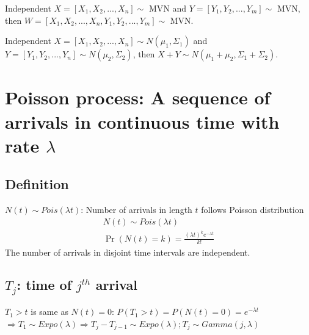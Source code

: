 \documentclass[11pt]{elegantbook}
\begin{document}
\begin{theorem}
    Independent $X=[X_1,X_2,...,X_n]\sim$ MVN and $Y=[Y_1,Y_2,...,Y_m]\sim$ MVN, then $W=[X_1,X_2,...,X_n,Y_1,Y_2,...,Y_m]\sim$ MVN.
\end{theorem}

\begin{theorem}
    Independent $X=[X_1,X_2,...,X_n]\sim N(\mu_1,\Sigma_1)$ and $Y=[Y_1,Y_2,...,Y_n]\sim N(\mu_2,\Sigma_2)$, then $X+Y\sim N(\mu_1+\mu_2,\Sigma_1+\Sigma_2)$.
\end{theorem}














\section{Poisson process: A sequence of arrivals in continuous time with rate $\lambda$}
\subsection{Definition}
$N(t)\sim Pois(\lambda t)$: Number of arrivals in length $t$ follows Poisson distribution
\begin{equation}
    \begin{aligned}
        N(t)\sim Pois(\lambda t)\\
        \Pr(N(t)=k)=\frac{(\lambda t)^k e^{-\lambda t}}{k!}
    \end{aligned}
    \nonumber
\end{equation}
The number of arrivals in disjoint time intervals are independent.
\subsection{$T_j$: time of $j^{th}$ arrival}
$T_1>t$ is same as $N(t)=0$: $P(T_1>t)=P(N(t)=0)=e^{-\lambda t}$\\
$\Rightarrow T_1\sim Expo(\lambda) \Rightarrow T_j-T_{j-1}\sim Expo(\lambda); T_j\sim Gamma(j,\lambda)$
\end{document}
